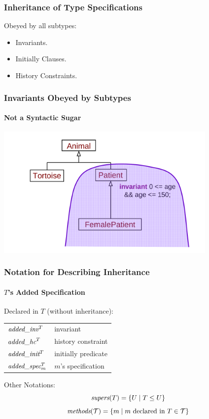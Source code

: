 \begin{frame}
\frametitle{Inheritance of Type Specifications}

Obeyed by all subtypes:
\begin{itemize}
\item
Invariants.

\item
Initially Clauses.

\item
History Constraints.
\end{itemize}
\end{frame}

\begin{frame}
\frametitle{Invariants Obeyed by Subtypes}
\framesubtitle{Not a Syntactic Sugar}
\includegraphics[width=4.25in]{invariant-inh}
\end{frame}

\begin{frame}
\frametitle{Notation for Describing Inheritance}
\framesubtitle{$T$'s Added Specification}

Declared in $T$ (without inheritance):
\begin{center}
\begin{tabular}{ll}
${\textit{added}}\_{\textit{inv}}^T$ & invariant \\
${\textit{added}}\_{\textit{hc}}^T$ & history constraint\\
${\textit{added}}\_{\textit{init}}^T$ & initially predicate \\
${\textit{added}}\_{\textit{spec}}^T_m$ & $m$'s specification \\
\end{tabular}
\end{center}

Other Notations:
\begin{displaymath}
\textit{supers}(T) = \{U \mid T \leq U\}
\end{displaymath}
\begin{displaymath}
\textit{methods}({\cal T}) = \{m \mid m \mbox{ declared in } T \in {\cal T}\}
\end{displaymath}
\end{frame}

